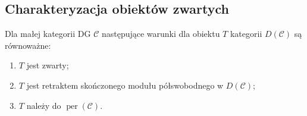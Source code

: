 \subsection{Charakteryzacja obiektów zwartych}

\begin{twierdzenie}\label{cat:thm:dg-perfect-compact}
Dla małej kategorii DG $\mathcal C$ następujące warunki dla obiektu $T$ kategorii $D(\mathcal C)$ są równoważne:
\begin{enumerate}
 \item $T$ jest zwarty;
 \item $T$ jest retraktem skończonego modułu półswobodnego w $D(\mathcal C)$;
 \item $T$ należy do $\operatorname{per}(\mathcal C)$.
\end{enumerate}
\end{twierdzenie}
